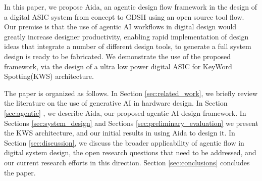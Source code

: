 In this paper, we propose Aida, an agentic design flow framework in the design of a digital ASIC system from concept to GDSII using an open source tool flow. Our premise is that the use of agentic AI workflows in digital design would greatly increase designer productivity, enabling rapid implementation of design ideas that integrate a number of different design tools, to generate a full system design is ready to be fabricated. We demonstrate the use of the proposed framework, via the design of a ultra low power digital ASIC for KeyWord Spotting(KWS) architecture. 

The paper is organized as follows. In Section \ref{sec:related_work}, we briefly review the literature on the use of generative AI in hardware design. 
In Section \ref{sec:agentic} , we describe Aida, our proposed agentic AI design framework. In Sections \ref{sec:system_design} and Sections \ref{sec:preliminary_evaluation} we present the KWS architecture, and our initial results in using Aida to design it. In Section \ref{sec:discussion}, we discuss the broader applicability of agentic flow in digital system design, the open research questions that need to be addressed, and our current research efforts in this direction. Section \ref{sec:conclusions} concludes the paper.

